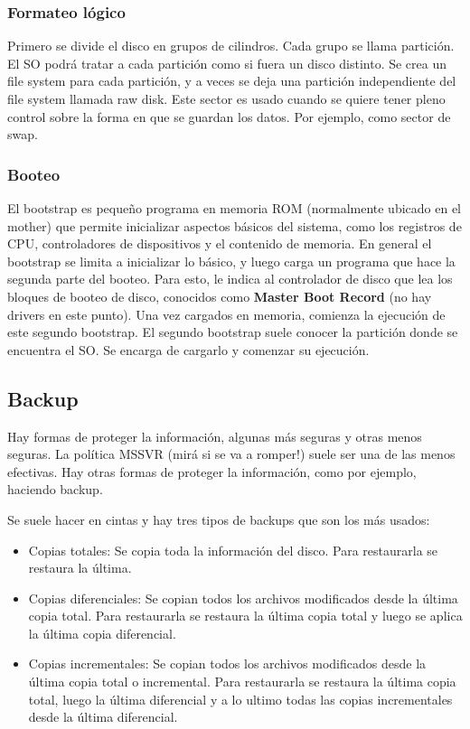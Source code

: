 \documentclass{article}
\begin{document}
\subsubsection{Formateo l\'ogico}

Primero se divide el disco en grupos de cilindros. Cada grupo se
llama partición. El SO podrá tratar a cada partición como si fuera
un disco distinto. Se crea un file system para cada partición, y a veces se
deja una partición independiente del file system llamada raw disk. Este sector es usado cuando se quiere tener pleno control sobre la
forma en que se guardan los datos. Por ejemplo, como sector de swap.

\subsubsection{Booteo}
El bootstrap es pequeño programa en memoria ROM (normalmente ubicado en el mother) que permite inicializar aspectos básicos del sistema, como los registros de CPU, controladores de dispositivos y el contenido de memoria. En general el bootstrap se limita a inicializar lo básico, y luego
carga un programa que hace la segunda parte del booteo. Para esto, le indica al controlador de disco que lea los bloques de booteo de disco, conocidos como \textbf{Master Boot Record} (no hay drivers en este punto). Una vez cargados en memoria, comienza la ejecución de este segundo bootstrap. El segundo bootstrap suele conocer la partición donde se encuentra el SO. Se encarga de cargarlo y comenzar su ejecución.

\subsection{Backup}

Hay formas de proteger la informaci\'on, algunas m\'as seguras y otras menos seguras. La pol\'itica MSSVR (mir\'a si se va a romper!) suele ser una de las menos efectivas. Hay otras formas de proteger la informaci\'on, como por ejemplo, haciendo backup.

Se suele hacer en cintas y hay tres tipos de backups que son los m\'as usados:

\begin{itemize}
\item Copias totales: Se copia toda la informaci\'on del disco. Para restaurarla se restaura la última.
\item Copias diferenciales: Se copian todos los archivos modificados desde la \'ultima copia total. Para restaurarla se restaura la última copia total y luego se aplica la última copia diferencial.
\item Copias incrementales: Se copian todos los archivos modificados desde la \'ultima copia total o incremental. Para restaurarla se restaura la última copia total, luego la última diferencial y a lo ultimo todas las copias incrementales desde la última diferencial.
\end{itemize}
\end{document}
